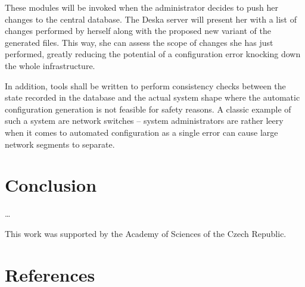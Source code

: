 \documentclass[a4paper]{jpconf}
\begin{document}
These modules will be invoked when the administrator decides to push her changes to the central database.  The Deska server will
present her with a list of changes performed by herself along with the proposed new variant of the generated files.  This way, she can
assess the scope of changes she has just performed, greatly reducing the potential of a configuration error knocking down the whole
infrastructure.

In addition, tools shall be written to perform consistency checks between the state recorded in the database and the actual system
shape where the automatic configuration generation is not feasible for safety reasons.  A classic example of such a system are network
switches -- system administrators are rather leery when it comes to automated configuration as a single error can cause large network
segments to separate.

\section{Conclusion}

\ldots

\ack
This work was supported by the Academy of Sciences of the Czech Republic.

\section*{References}




\end{document}
